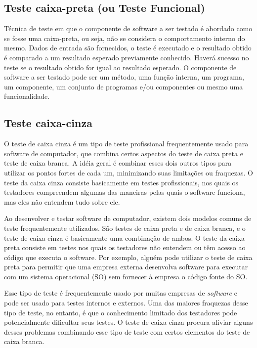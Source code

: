 \nocite{branca}
\nocite{testeufpr}

\subsection{Teste caixa-preta (ou Teste Funcional)}

Técnica de teste em que o componente de software a ser testado é abordado como se fosse uma caixa-preta, ou seja, não se considera o comportamento interno do mesmo.
Dados de entrada são fornecidos, o teste é executado e o resultado obtido é comparado a um resultado esperado previamente conhecido.
Haverá sucesso no teste se o resultado obtido for igual ao resultado esperado.
O componente de software a ser testado pode ser um método, uma função interna, um programa, um componente, um conjunto de programas e/ou componentes ou mesmo uma funcionalidade.

\nocite{canaltiteste}

\subsection{Teste caixa-cinza}

O teste de caixa cinza é um tipo de teste profissional frequentemente usado para software de computador, que combina certos aspectos do teste de caixa preta e teste de caixa branca. A idéia geral é combinar esses dois outros tipos para utilizar os pontos fortes de cada um, minimizando suas limitações ou fraquezas. O teste da caixa cinza consiste basicamente em testes profissionais, nos quais os testadores compreendem algumas das maneiras pelas quais o software funciona, mas eles não entendem tudo sobre ele.

Ao desenvolver e testar software de computador, existem dois modelos comuns de teste frequentemente utilizados. São testes de caixa preta e de caixa branca, e o teste de caixa cinza é basicamente uma combinação de ambos. O teste da caixa preta consiste em testes nos quais os testadores não entendem ou têm acesso ao código que executa o software. Por exemplo, alguém pode utilizar o teste de caixa preta para permitir que uma empresa externa desenvolva software para executar com um sistema operacional (SO) sem fornecer à empresa o código fonte do SO.

Esse tipo de teste é frequentemente usado por muitas empresas de \textit{software} e pode ser usado para testes internos e externos. Uma das maiores fraquezas desse tipo de teste, no entanto, é que o conhecimento limitado dos testadores pode potencialmente dificultar seus testes. O teste de caixa cinza procura aliviar alguns desses problemas combinando esse tipo de teste com certos elementos do teste de caixa branca.

